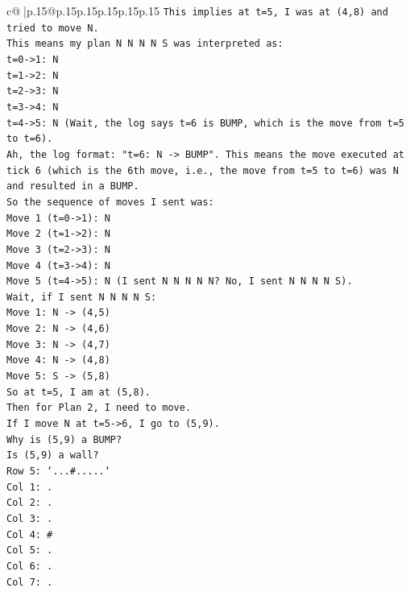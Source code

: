\documentclass{article}
\begin{document}
{\begin{supertabular}{c@{$\;$}|p{.15\linewidth}@{}p{.15\linewidth}p{.15\linewidth}p{.15\linewidth}p{.15\linewidth}p{.15\linewidth}}
{{{\texttt{This implies at t=5, I was at (4,8) and tried to move N.} \\
\texttt{This means my plan N N N N S was interpreted as:} \\
\texttt{t=0{-}>1: N} \\
\texttt{t=1{-}>2: N} \\
\texttt{t=2{-}>3: N} \\
\texttt{t=3{-}>4: N} \\
\texttt{t=4{-}>5: N (Wait, the log says t=6 is BUMP, which is the move from t=5 to t=6).} \\
\texttt{Ah, the log format: "t=6: N {-}> BUMP". This means the move executed at tick 6 (which is the 6th move, i.e., the move from t=5 to t=6) was N and resulted in a BUMP.} \\
\texttt{So the sequence of moves I sent was:} \\
\texttt{Move 1 (t=0{-}>1): N} \\
\texttt{Move 2 (t=1{-}>2): N} \\
\texttt{Move 3 (t=2{-}>3): N} \\
\texttt{Move 4 (t=3{-}>4): N} \\
\texttt{Move 5 (t=4{-}>5): N (I sent N N N N N? No, I sent N N N N S).} \\
\texttt{Wait, if I sent N N N N S:} \\
\texttt{Move 1: N {-}> (4,5)} \\
\texttt{Move 2: N {-}> (4,6)} \\
\texttt{Move 3: N {-}> (4,7)} \\
\texttt{Move 4: N {-}> (4,8)} \\
\texttt{Move 5: S {-}> (5,8)} \\
\texttt{So at t=5, I am at (5,8).} \\
\texttt{Then for Plan 2, I need to move.} \\
\texttt{If I move N at t=5{-}>6, I go to (5,9).} \\
\texttt{Why is (5,9) a BUMP?} \\
\texttt{Is (5,9) a wall?} \\
\texttt{Row 5: `...\#.....`} \\
\texttt{Col 1: .} \\
\texttt{Col 2: .} \\
\texttt{Col 3: .} \\
\texttt{Col 4: \#} \\
\texttt{Col 5: .} \\
\texttt{Col 6: .} \\
\texttt{Col 7: .} \\
}}}
\end{supertabular}}
\end{document}
